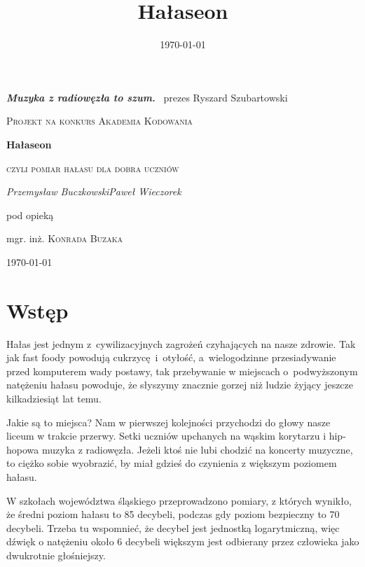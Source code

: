 \documentclass[12pt, a4paper]{article}
\title{Hałaseon}
\date{\today}
\begin{document}
\begin{titlepage}
	\begin{flushright}
	{\large \color{Goldenrod} \emph{\textbf{Muzyka z radiowęzła to szum.}} \linebreak}
	~prezes Ryszard Szubartowski
	\end{flushright}
	\centering
	\vspace{1.5 cm}
	{\scshape Projekt na konkurs Akademia Kodowania\par}
	\vspace{1.5 cm}
	{\huge\bfseries Hałaseon\par}
	\vspace{0.1cm}
	{\scshape\Large czyli pomiar hałasu dla dobra uczniów\par}
	\vspace{2cm}
	{\Large\itshape Przemysław Buczkowski\linebreak Paweł Wieczorek\par}
	\vfill
	pod opieką\par
	mgr. inż. \textsc{Konrada Buzaka}

	\vfill

	{\large \today\par}
\end{titlepage}

\tableofcontents

\vfill \pagebreak

\section{Wstęp}

Hałas jest jednym z~cywilizacyjnych zagrożeń czyhających na nasze zdrowie. Tak jak fast foody powodują cukrzycę~i~otyłość, a~wielogodzinne przesiadywanie przed komputerem wady postawy, tak przebywanie w miejscach o~podwyższonym natężeniu hałasu powoduje, że słyszymy znacznie gorzej niż ludzie żyjący jeszcze kilkadziesiąt lat temu.

Jakie są to miejsca? Nam w pierwszej kolejności przychodzi do głowy nasze liceum w trakcie przerwy. Setki uczniów upchanych na wąskim korytarzu i hip-hopowa muzyka z radiowęzła. Jeżeli ktoś nie lubi chodzić na koncerty muzyczne, to ciężko sobie wyobrazić, by miał gdzieś do czynienia z większym poziomem hałasu.

W szkołach województwa śląskiego przeprowadzono pomiary, z których wynikło, że średni poziom hałasu to 85 decybeli\cite{dz}, podczas gdy poziom bezpieczny to 70 decybeli\cite{wikihalas}. Trzeba tu wspomnieć, że decybel jest jednostką logarytmiczną, więc dźwięk o natężeniu około 6 decybeli większym jest odbierany przez człowieka jako dwukrotnie głośniejszy.
\end{document}
